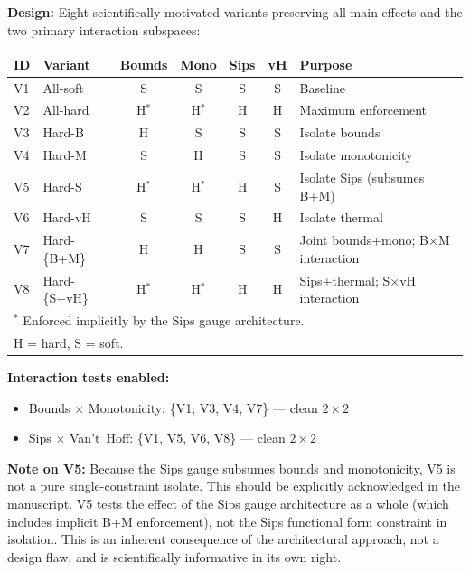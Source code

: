\documentclass[12pt,a4paper]{article}
\begin{document}
\begin{mathbox}
\textbf{Design:} Eight scientifically motivated variants preserving all
main effects and the two primary interaction subspaces:

\begin{center}
\small
\begin{tabular}{llccccl}
\toprule
\textbf{ID} & \textbf{Variant} & \textbf{Bounds} & \textbf{Mono} &
  \textbf{Sips} & \textbf{vH} & \textbf{Purpose} \\
\midrule
V1 & All-soft      & S & S & S & S & Baseline \\
V2 & All-hard      & H$^*$ & H$^*$ & H & H & Maximum enforcement \\
V3 & Hard-B        & H & S & S & S & Isolate bounds \\
V4 & Hard-M        & S & H & S & S & Isolate monotonicity \\
V5 & Hard-S        & H$^*$ & H$^*$ & H & S & Isolate Sips (subsumes B+M) \\
V6 & Hard-vH       & S & S & S & H & Isolate thermal \\
V7 & Hard-\{B+M\}  & H & H & S & S & Joint bounds+mono; B$\times$M interaction \\
V8 & Hard-\{S+vH\} & H$^*$ & H$^*$ & H & H & Sips+thermal; S$\times$vH interaction \\
\bottomrule
\multicolumn{7}{l}{\small $^*$ Enforced implicitly by the Sips gauge architecture.}\\
\multicolumn{7}{l}{\small H = hard, S = soft.}\\
\end{tabular}
\end{center}

\textbf{Interaction tests enabled:}
\begin{itemize}[noitemsep]
  \item Bounds $\times$ Monotonicity: \{V1, V3, V4, V7\} --- clean $2\times2$
  \item Sips $\times$ Van't~Hoff: \{V1, V5, V6, V8\} --- clean $2\times2$
\end{itemize}

\textbf{Note on V5:} Because the Sips gauge subsumes bounds and
monotonicity, V5 is not a pure single-constraint isolate. This should
be explicitly acknowledged in the manuscript. V5 tests the effect of
the Sips gauge architecture as a whole (which includes implicit B+M
enforcement), not the Sips functional form constraint in isolation.
This is an inherent consequence of the architectural approach, not a
design flaw, and is scientifically informative in its own right.
\end{mathbox}
\end{document}
